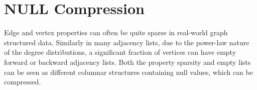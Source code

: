 

\section{NULL Compression}
\label{sec:null}

Edge and vertex properties can often be quite sparse in real-world graph structured data. Similarly in many adjacency lists, due to the power-law nature of the degree distributions, a significant fraction of vertices can have empty forward or backward adjacency lists. Both the property sparsity and empty lists can be seen as different columnar structures containing null values, which can be compressed.


